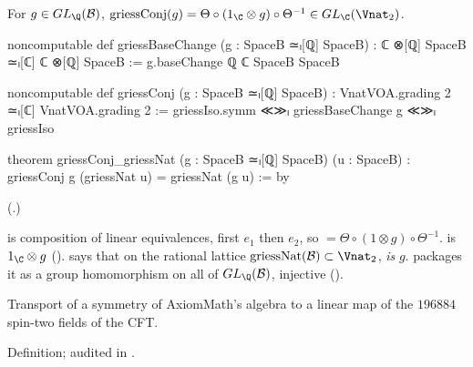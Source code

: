 \begin{definition}\label{ch21:def:griessConj}
For $g\in GL_\Q(\chXXIB)$, $\mathrm{griessConj}(g)=\Theta\circ(1_\C\otimes g)\circ\Theta^{-1}\in GL_\C(\Vnat_2)$.
\end{definition}
\begin{leancode}
noncomputable def griessBaseChange (g : SpaceB ≃ₗ[ℚ] SpaceB) : ℂ ⊗[ℚ] SpaceB ≃ₗ[ℂ] ℂ ⊗[ℚ] SpaceB :=
  g.baseChange ℚ ℂ SpaceB SpaceB
\end{leancode}
\begin{leancode}
noncomputable def griessConj (g : SpaceB ≃ₗ[ℚ] SpaceB) :
    VnatVOA.grading 2 ≃ₗ[ℂ] VnatVOA.grading 2 :=
  griessIso.symm ≪≫ₗ griessBaseChange g ≪≫ₗ griessIso
\end{leancode}
\begin{leancode}
theorem griessConj_griessNat (g : SpaceB ≃ₗ[ℚ] SpaceB) (u : SpaceB) :
    griessConj g (griessNat u) = griessNat (g u) := by
\end{leancode}
(.)
\begin{dictionary}
 is composition of linear equivalences, first $e_1$ then $e_2$, so 
$=\Theta\circ(1\otimes g)\circ\Theta^{-1}$.   is $1_\C\otimes g$
().   says
that on the rational lattice $\mathrm{griessNat}(\chXXIB)\subset\Vnat_2$,  \emph{is} $g$.
 packages it as a group homomorphism on all of $GL_\Q(\chXXIB)$, injective
().
\end{dictionary}
\begin{physics}
Transport of a symmetry of AxiomMath's algebra to a linear map of the $196884$ spin-two fields of the CFT.
\end{physics}
\begin{status}
Definition; audited in .
\end{status}

